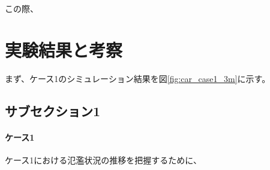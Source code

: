 \documentclass[12pt]{jsarticle}
\begin{document}
  \noindent
  この際、

  \section{実験結果と考察}

  まず、ケース1のシミュレーション結果を図\ref{fig:car_case1_3m}に示す。

  \subsection{サブセクション1}

  \paragraph{ケース1}

  ケース1における氾濫状況の推移を把握するために、
\end{document}
